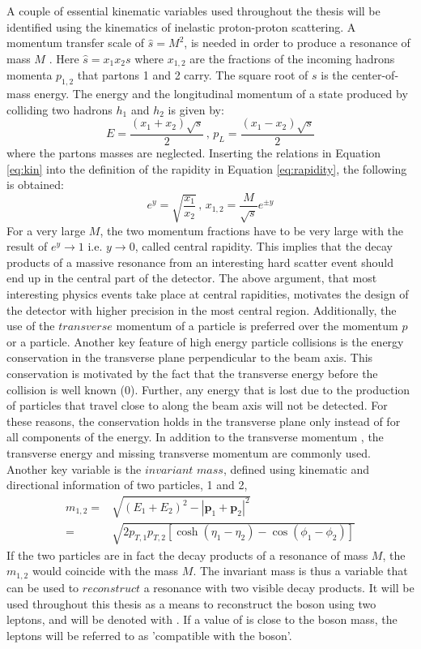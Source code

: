 A couple of essential kinematic variables used throughout the thesis will be identified using the kinematics of inelastic proton-proton scattering. 
A momentum transfer scale of $\hat{s}=M^{2}$, is needed in order to produce a resonance of mass $M$ \cite{Dissertori:2010xe}. 
Here $\hat{s}=x_{1}x_{2}s$ where $x_{1,2}$ are the fractions of the incoming hadrons momenta $p_{1,2}$ that partons 1 and 2 carry. 
The square root of $s$ is the center-of-mass energy. 
The energy and the longitudinal momentum of a state produced by colliding two hadrons $h_{1}$ and $h_{2}$ is given by:
\begin{equation}
E=\frac{(x_{1}+x_{2})\sqrt{s}}{2}\, , \, p_{L}=\frac{(x_{1}-x_{2})\sqrt{s}}{2}
\label{eq:kin}
\end{equation}
where the partons masses are neglected. 
Inserting the relations in Equation \ref{eq:kin} into the definition of the rapidity in Equation \ref{eq:rapidity}, the following is obtained:
\begin{equation}
e^{y}=\sqrt{\frac{x_{1}}{x_{2}}}\, , \,x_{1,2}=\frac{M}{\sqrt{s}}e^{\pm y}
\end{equation}
For a very large $M$, the two momentum fractions have to be very large with the result of $e^{y}\rightarrow 1$ i.e. $y\rightarrow 0$, called central rapidity. 
This implies that the decay products of a massive resonance from an interesting hard scatter event should end up in the central part of the detector. 
\newpara
\noindent\justify
The above argument, that most interesting physics events take place at central rapidities, motivates the design of the detector with higher precision in the most central region.
Additionally, the use of the $transverse$ momentum \pt of a particle is preferred over the momentum $p$ or a particle. 
Another key feature of high energy particle collisions is the energy conservation in the transverse plane perpendicular to the beam axis.
This conservation is motivated by the fact that the transverse energy before the collision is well known (0). 
Further, any energy that is lost due to the production of particles that travel close to along the beam axis will not be detected. 
For these reasons, the conservation holds in the transverse plane only instead of for all components of the energy. 
In addition to the transverse momentum \pt, the transverse energy \ET and missing transverse momentum \ptmiss are commonly used.
\newpara
\noindent\justify
Another key variable is the $invariant$ $mass$, defined using kinematic and directional information of two particles, 1 and 2,
\begin{align} 
m_{1,2}=&\sqrt{(E_{1}+E_{2})^{2}-|\mathbf{p}_{1}+\mathbf{p}_{2}|^{2}}\\
    =&\sqrt{2p_{T,1}p_{T,2}[\cosh(\eta_{1}-\eta_{2})-\cos(\phi_{1}-\phi_{2})]} 
\end{align} 
If the two particles  are in fact the decay products of a resonance of mass $M$, the $m_{1,2}$ would coincide with the mass $M$. 
The invariant mass is thus a variable that can be used to $reconstruct$ a resonance with two visible decay products. 
It will be used throughout this thesis as a means to reconstruct the \PZ boson using two leptons, and will be denoted with \mll. 
If a  value of \mll is close to the \PZ boson mass, the leptons will be referred to as 'compatible with the \PZ boson'.  
